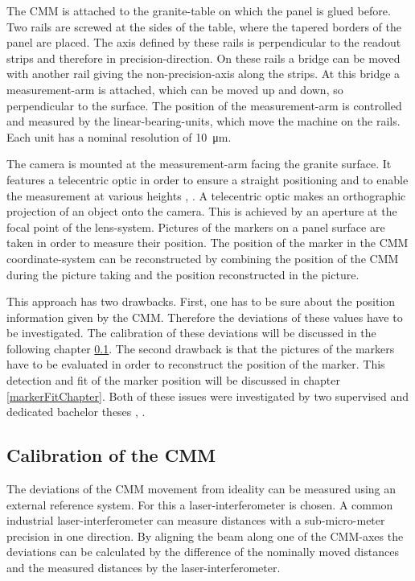 \documentclass[
twoside,            %
BCOR1.4cm,          %
10pt,               %
headings=normal,    %
headsepline,        %
clearplainpage,		%
final,              %
div=14,
open=right,
bibliography=toc
]{scrreprt}
\begin{document}
The CMM is attached to the granite-table on which the panel is glued before.
Two rails are screwed at the sides of the table, where the tapered borders of the panel are placed.
The axis defined by these rails is perpendicular to the readout strips and therefore in precision-direction.
On these rails a bridge can be moved with another rail giving the non-precision-axis along the strips.
At this bridge a measurement-arm is attached, which can be moved up and down, so perpendicular to the surface.
The position of the measurement-arm is controlled and measured by the linear-bearing-units, which move the machine on the rails.
Each unit has a nominal resolution of \SI{10}{\micro\m}.

The camera is mounted at the measurement-arm facing the granite surface.
It features a telecentric optic in order to ensure a straight positioning and to enable the measurement at various heights \cite{telecentric}, \cite{optoTele}.
A telecentric optic makes an orthographic projection of an object onto the camera.
This is achieved by an aperture at the focal point of the lens-system.
Pictures of the markers on a panel surface are taken in order to measure their position.
The position of the marker in the CMM coordinate-system can be reconstructed by combining the position of the CMM during the picture taking and the position reconstructed in the picture. 

This approach has two drawbacks.
First, one has to be sure about the position information given by the CMM.
Therefore the deviations of these values have to be investigated.
The calibration of these deviations will be discussed in the following chapter \ref{CMMcalibChapter}.
The second drawback is that the pictures of the markers have to be evaluated in order to reconstruct the position of the marker.
This detection and fit of the marker position will be discussed in chapter \ref{markerFitChapter}.
Both of these issues were investigated by two supervised and dedicated bachelor theses \cite{feilThesis}, \cite{neubertThesis}.

\subsection{Calibration of the CMM} \label{CMMcalibChapter}

The deviations of the CMM movement from ideality can be measured using an external reference system.
For this a laser-interferometer is chosen.
A common industrial laser-interferometer can measure distances with a sub-micro-meter precision in one direction.
By aligning the beam along one of the CMM-axes the deviations can be calculated by the difference of the nominally moved distances and the measured distances by the laser-interferometer.
\end{document}
